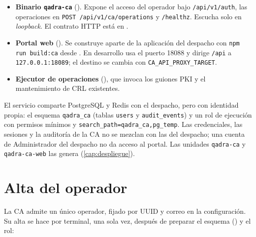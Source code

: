 \begin{itemize}
  \item \textbf{Binario \texttt{qadra-ca}} ().
        Expone el acceso del operador bajo \texttt{/api/v1/auth}, las
        operaciones en \texttt{POST /api/v1/ca/operations} y
        \texttt{/healthz}. Escucha solo en \emph{loopback}. El contrato HTTP
        está en .
  \item \textbf{Portal web} (). Se construye aparte de la
        aplicación del despacho con \texttt{npm run build:ca} desde
        . En desarrollo usa el puerto 18088 y dirige
        \texttt{/api} a \texttt{127.0.0.1:18089}; el destino se cambia con
        \texttt{CA\_API\_PROXY\_TARGET}.
  \item \textbf{Ejecutor de operaciones} (), que
        invoca los guiones PKI y el mantenimiento de CRL existentes.
\end{itemize}

El servicio comparte PostgreSQL y Redis con el despacho, pero con identidad
propia: el esquema \texttt{qadra\_ca} (tablas \texttt{users} y
\texttt{audit\_events}) y un rol de ejecución con permisos mínimos y
\texttt{search\_path=qadra\_ca,pg\_temp}. Las credenciales, las sesiones y la
auditoría de la CA no se mezclan con las del despacho; una cuenta de
Administrador del despacho no da acceso al portal. Las unidades
\texttt{qadra-ca} y \texttt{qadra-ca-web} las genera
 (\cref{cap:despliegue}).

\section{Alta del operador}\label{sec:ca-alta}

La CA admite un único operador, fijado por UUID y correo en la configuración.
Su alta se hace por terminal, una sola vez, después de preparar el esquema
() y el rol:

